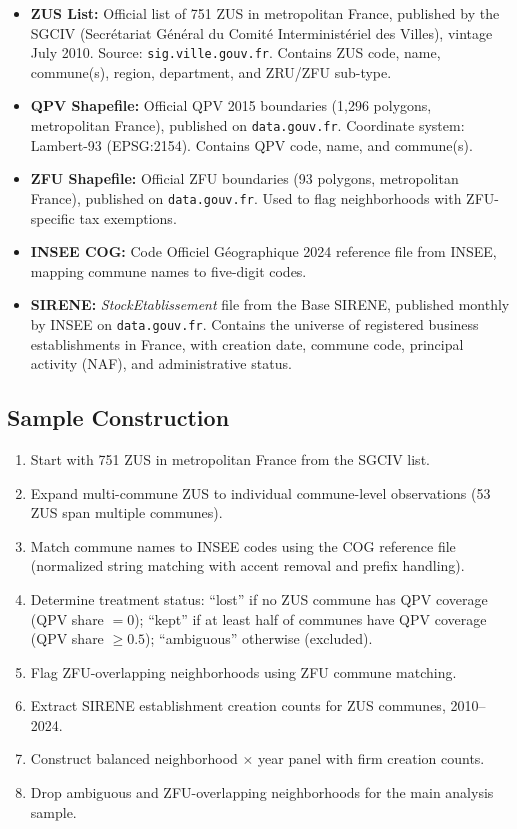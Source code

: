 \documentclass[12pt]{article}
\begin{document}
\begin{itemize}
\item \textbf{ZUS List:} Official list of 751 ZUS in metropolitan France, published by the SGCIV (Secr\'etariat G\'en\'eral du Comit\'e Interminist\'eriel des Villes), vintage July 2010. Source: \texttt{sig.ville.gouv.fr}. Contains ZUS code, name, commune(s), region, department, and ZRU/ZFU sub-type.

\item \textbf{QPV Shapefile:} Official QPV 2015 boundaries (1,296 polygons, metropolitan France), published on \texttt{data.gouv.fr}. Coordinate system: Lambert-93 (EPSG:2154). Contains QPV code, name, and commune(s).

\item \textbf{ZFU Shapefile:} Official ZFU boundaries (93 polygons, metropolitan France), published on \texttt{data.gouv.fr}. Used to flag neighborhoods with ZFU-specific tax exemptions.

\item \textbf{INSEE COG:} Code Officiel G\'eographique 2024 reference file from INSEE, mapping commune names to five-digit codes.

\item \textbf{SIRENE:} \textit{StockEtablissement} file from the Base SIRENE, published monthly by INSEE on \texttt{data.gouv.fr}. Contains the universe of registered business establishments in France, with creation date, commune code, principal activity (NAF), and administrative status.
\end{itemize}

\subsection{Sample Construction}

\begin{enumerate}
\item Start with 751 ZUS in metropolitan France from the SGCIV list.
\item Expand multi-commune ZUS to individual commune-level observations (53 ZUS span multiple communes).
\item Match commune names to INSEE codes using the COG reference file (normalized string matching with accent removal and prefix handling).
\item Determine treatment status: ``lost'' if no ZUS commune has QPV coverage (QPV share $= 0$); ``kept'' if at least half of communes have QPV coverage (QPV share $\geq 0.5$); ``ambiguous'' otherwise (excluded).
\item Flag ZFU-overlapping neighborhoods using ZFU commune matching.
\item Extract SIRENE establishment creation counts for ZUS communes, 2010--2024.
\item Construct balanced neighborhood $\times$ year panel with firm creation counts.
\item Drop ambiguous and ZFU-overlapping neighborhoods for the main analysis sample.
\end{enumerate}
\end{document}
